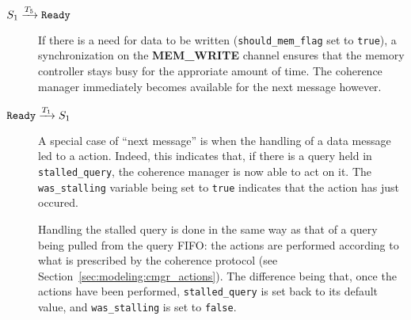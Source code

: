 \begin{description}
\item[$S_1 \xrightarrow[]{T_{5}} \texttt{Ready}$]
   If there is a need for data to be written (\lstinline!should_mem_flag! set
   to \lstinline!true!), a synchronization on the \textbf{MEM\_WRITE} channel
   ensures that the memory controller stays busy for the approriate amount of
   time. The coherence manager immediately becomes available for the next
   message however.

\item[$\texttt{Ready} \xrightarrow[]{T_{1}} S_1$]
   A special case of ``next message'' is when the handling of a data message
   led to a \resumeact{} action. Indeed, this indicates that, if there is a
   query held in \lstinline!stalled_query!, the coherence manager is now able
   to act on it. The \lstinline!was_stalling! variable being set to
   \lstinline!true!  indicates that the \resumeact{} action has just occured.

   Handling the stalled query is done in the same way as that of a query being
   pulled from the query FIFO: the actions are performed according to what is
   prescribed by the coherence protocol (see
   Section~\ref{sec:modeling:cmgr_actions}). The difference being that, once
   the actions have been performed, \lstinline!stalled_query! is set back to
   its default value, and \lstinline!was_stalling! is set to \lstinline!false!.
\end{description}

